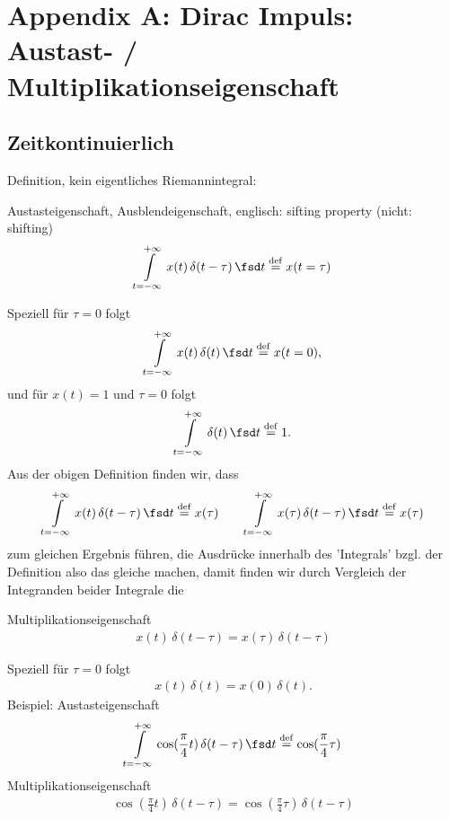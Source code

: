 \clearpage
\section{Appendix A: Dirac Impuls: Austast- / Multiplikationseigenschaft}
%
\subsection{Zeitkontinuierlich}
Definition, kein eigentliches Riemannintegral:
\begin{mdframed}
Austasteigenschaft, Ausblendeigenschaft, englisch: sifting property (nicht: shifting)
\begin{align}
\int\limits_{t=-\infty}^{+\infty} x(t) \, \delta(t-\tau) \, \fsd t \stackrel{\mathrm{def}}= x(t=\tau)
\label{eq:AppA_SifitingCT}
\end{align}
\end{mdframed}
Speziell für $\tau=0$ folgt
\begin{align}
\int\limits_{t=-\infty}^{+\infty} x(t) \, \delta(t) \, \fsd t \stackrel{\mathrm{def}}= x(t=0),
\end{align}
und für $x(t)=1$ und $\tau=0$ folgt
\begin{align}
\int\limits_{t=-\infty}^{+\infty} \delta(t) \, \fsd t \stackrel{\mathrm{def}}= 1.
\end{align}
Aus der obigen Definition finden wir, dass
\begin{align}
\int\limits_{t=-\infty}^{+\infty} x(t) \, \delta(t-\tau) \, \fsd t \stackrel{\mathrm{def}}= x(\tau)\qquad
\int\limits_{t=-\infty}^{+\infty} x(\tau) \, \delta(t-\tau) \, \fsd t \stackrel{\mathrm{def}}= x(\tau)
\end{align}
zum gleichen Ergebnis führen, die Ausdrücke innerhalb des 'Integrals' bzgl.
der Definition also das gleiche machen, damit finden wir durch Vergleich der Integranden beider Integrale die
\begin{mdframed}
Multiplikationseigenschaft
\begin{align}
x(t) \, \delta(t-\tau) = x(\tau) \, \delta(t-\tau)
\end{align}
\end{mdframed}
Speziell für $\tau=0$ folgt
\begin{align}
x(t) \, \delta(t) = x(0) \, \delta(t).
\end{align}
%
Beispiel:
Austasteigenschaft
\begin{align}
\int\limits_{t=-\infty}^{+\infty} \cos(\frac{\pi}{4} t) \, \delta(t-\tau) \, \fsd t \stackrel{\mathrm{def}}=\cos(\frac{\pi}{4} \tau)
\end{align}
Multiplikationseigenschaft
\begin{align}
\cos(\frac{\pi}{4} t) \, \delta(t-\tau) = \cos(\frac{\pi}{4} \tau) \, \delta(t-\tau)
\end{align}

